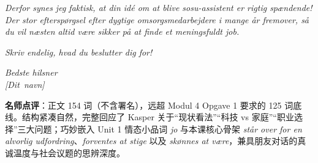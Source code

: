 \begin{answerbox}
\textit{Derfor synes jeg faktisk, at din idé om at blive sosu-assistent er rigtig spændende! Der  stor efterspørgsel efter dygtige omsorgsmedarbejdere i mange år fremover, så du vil næsten altid være sikker på at finde et meningsfuldt job.}

\textit{Skriv endelig, hvad du beslutter dig for!}

\textit{Bedste hilsner\\
\mbox{[Dit navn]}}

\small\textbf{名师点评}：正文 154 词（不含署名），远超 Modul 4 Opgave 1 要求的 125 词底线。结构紧凑自然，完整回应了 Kasper 关于“现状看法”“科技 vs 家庭”“职业选择”三大问题；巧妙嵌入 Unit 1 情态小品词 \textit{jo} 与本课核心骨架 \textit{står over for en alvorlig udfordring}、\textit{forventes at stige} 以及 \textit{skønnes at være}，兼具朋友对话的真诚温度与社会议题的思辨深度。
\end{answerbox}